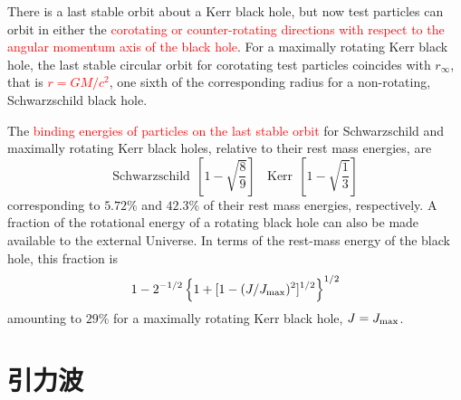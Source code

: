 \documentclass[12pt,a4paper]{article}
\begin{document}
There is a last stable orbit about a Kerr black hole, but now test particles can orbit in either the \textcolor{red}{corotating or counter-rotating directions with respect to the angular momentum axis of the black hole}. For a maximally rotating Kerr black hole, the last stable circular orbit for corotating test particles coincides with $r_{\infty}$, that is \textcolor{red}{$r = GM/c^2$}, one sixth of the corresponding radius for a non-rotating, Schwarzschild black hole.

The \textcolor{red}{binding energies of particles on the last stable orbit} for Schwarzschild and maximally rotating Kerr black holes, relative to their rest mass energies, are
\begin{equation}
\text{Schwarzschild} ~~ \left[1 -\sqrt{\frac{8}{9}} \right] ~~~~ \text{Kerr} ~~\left[1 -\sqrt{\frac{1}{3}} \right]
\end{equation}
corresponding to $5.72\%$ and $42.3\%$ of their rest mass energies, respectively. A fraction of the rotational energy of a rotating black hole can also be made available to the external Universe. In terms of the rest-mass energy of the black hole, this fraction is
\begin{equation}
1-2^{-1/2} \left\{1+[1-(J/J_{\rm max})^2]^{1/2} \right\}^{1/2} 
\end{equation}
amounting to $29\%$ for a maximally rotating Kerr black hole, $J = J_{\rm max}$.








\section{引力波}
\end{document}
